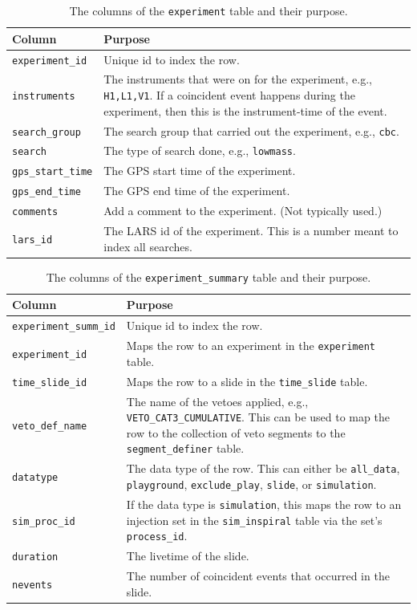\begin{table}[p]
\label{tab:experiment}
\center
\begin{tabular}{l | p{10cm}}
Column      &   Purpose     \\
\hline \hline
\texttt{experiment\_id}  &  Unique id to index the row. \\
\hline
\texttt{instruments}    &  The instruments that were on for the experiment, e.g., \texttt{H1,L1,V1}. If a coincident event happens during the experiment, then this is the instrument-time of the event.\\
\hline
\texttt{search\_group}  &  The search group that carried out the experiment, e.g., \texttt{cbc}. \\
\hline
\texttt{search}     &   The type of search done, e.g., \texttt{lowmass}. \\
\hline
\texttt{gps\_start\_time}   &   The GPS start time of the experiment. \\
\hline
\texttt{gps\_end\_time}     &   The GPS end time of the experiment. \\
\hline
\texttt{comments}   &  Add a comment to the experiment. (Not typically used.) \\
\hline
\texttt{lars\_id}   & The LARS id of the experiment. This is a number meant to index all searches. \\
\end{tabular}
\caption{The columns of the \texttt{experiment} table and their purpose.}
\end{table}

\begin{table}[p]
\label{tab:experiment_summary}
\center
\begin{tabular}{l | p{10cm}}
Column      &   Purpose     \\
\hline \hline
\texttt{experiment\_summ\_id}   &   Unique id to index the row. \\
\hline
\texttt{experiment\_id}     &   Maps the row to an experiment in the \texttt{experiment} table. \\
\hline
\texttt{time\_slide\_id}    &   Maps the row to a slide in the \texttt{time\_slide} table. \\
\hline
\texttt{veto\_def\_name}    &   The name of the vetoes applied, e.g., \texttt{VETO\_CAT3\_CUMULATIVE}. This can be used to map the row to the collection of veto segments to the \texttt{segment\_definer} table. \\
\hline
\texttt{datatype}   &   The data type of the row. This can either be \texttt{all\_data}, \texttt{playground}, \texttt{exclude\_play}, \texttt{slide}, or \texttt{simulation}. \\
\hline
\texttt{sim\_proc\_id}  &   If the data type is \texttt{simulation}, this maps the row to an injection set in the \texttt{sim\_inspiral} table via the set's \texttt{process\_id}. \\
\hline
\texttt{duration}   &   The livetime of the slide. \\
\hline
\texttt{nevents}    &   The number of coincident events that occurred in the slide.
\end{tabular}
\caption{The columns of the \texttt{experiment\_summary} table and their purpose.}
\end{table}

